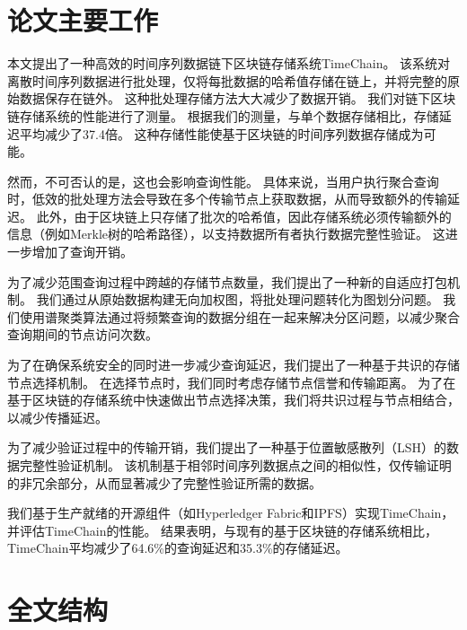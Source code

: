 \section{论文主要工作}
本文提出了一种高效的时间序列数据链下区块链存储系统TimeChain。
该系统对离散时间序列数据进行批处理，仅将每批数据的哈希值存储在链上，并将完整的原始数据保存在链外。
这种批处理存储方法大大减少了数据开销。
我们对链下区块链存储系统的性能进行了测量。
根据我们的测量，与单个数据存储相比，存储延迟平均减少了37.4倍。
这种存储性能使基于区块链的时间序列数据存储成为可能。

然而，不可否认的是，这也会影响查询性能。
具体来说，当用户执行聚合查询时，低效的批处理方法会导致在多个传输节点上获取数据，从而导致额外的传输延迟。
此外，由于区块链上只存储了批次的哈希值，因此存储系统必须传输额外的信息（例如Merkle树的哈希路径），以支持数据所有者执行数据完整性验证。
这进一步增加了查询开销。

为了减少范围查询过程中跨越的存储节点数量，我们提出了一种新的自适应打包机制。
我们通过从原始数据构建无向加权图，将批处理问题转化为图划分问题。
我们使用谱聚类算法通过将频繁查询的数据分组在一起来解决分区问题，以减少聚合查询期间的节点访问次数。

为了在确保系统安全的同时进一步减少查询延迟，我们提出了一种基于共识的存储节点选择机制。
在选择节点时，我们同时考虑存储节点信誉和传输距离。
为了在基于区块链的存储系统中快速做出节点选择决策，我们将共识过程与节点相结合，以减少传播延迟。

为了减少验证过程中的传输开销，我们提出了一种基于位置敏感散列（LSH）的数据完整性验证机制。
该机制基于相邻时间序列数据点之间的相似性，仅传输证明的非冗余部分，从而显著减少了完整性验证所需的数据。

我们基于生产就绪的开源组件（如Hyperledger Fabric和IPFS）实现TimeChain，并评估TimeChain的性能。
结果表明，与现有的基于区块链的存储系统相比，TimeChain平均减少了64.6\%的查询延迟和35.3\%的存储延迟。

\section{全文结构}

